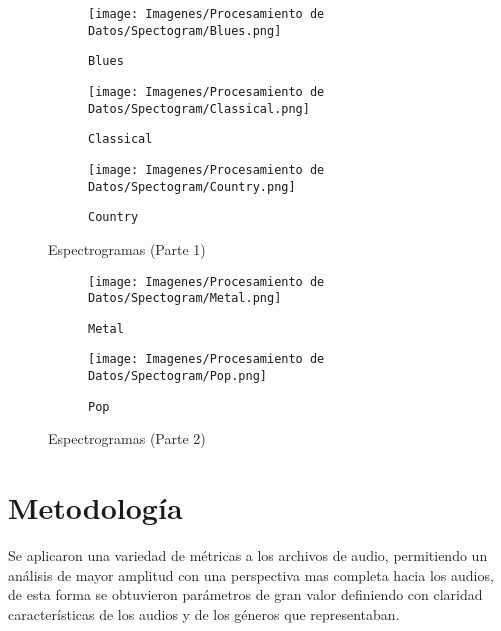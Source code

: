 \documentclass{article}
\begin{document}
\begin{figure}[htbp]
    \centering

    \begin{subfigure}{0.9\textwidth}
        \centering
        \texttt{[image: Imagenes/Procesamiento de Datos/Spectogram/Blues.png]}
        \caption{\texttt{Blues}}
    \end{subfigure}
    \vspace{0.5cm}

    \begin{subfigure}{0.9\textwidth}
        \centering
        \texttt{[image: Imagenes/Procesamiento de Datos/Spectogram/Classical.png]}
        \caption{\texttt{Classical}}
    \end{subfigure}
    \vspace{0.5cm}

    \begin{subfigure}{0.9\textwidth}
        \centering
        \texttt{[image: Imagenes/Procesamiento de Datos/Spectogram/Country.png]}
        \caption{\texttt{Country}}
    \end{subfigure}

    \caption{Espectrogramas (Parte 1)}
    \label{fig:5x1grid-part1}
\end{figure}

\begin{figure}[htbp]
    \ContinuedFloat
    \centering

    \begin{subfigure}{0.9\textwidth}
        \centering
        \texttt{[image: Imagenes/Procesamiento de Datos/Spectogram/Metal.png]}
        \caption{\texttt{Metal}}
    \end{subfigure}
    \vspace{0.5cm}

    \begin{subfigure}{0.9\textwidth}
        \centering
        \texttt{[image: Imagenes/Procesamiento de Datos/Spectogram/Pop.png]}
        \caption{\texttt{Pop}}
    \end{subfigure}

    \caption{Espectrogramas (Parte 2)}
    \label{fig:5x1grid-part2}
\end{figure}


\section{Metodología}
Se aplicaron una variedad de métricas a los archivos de audio, permitiendo un análisis de mayor amplitud con una perspectiva mas completa hacia los audios, de esta forma se obtuvieron parámetros de gran valor definiendo con claridad características de los audios y de los géneros que representaban.
\end{document}
